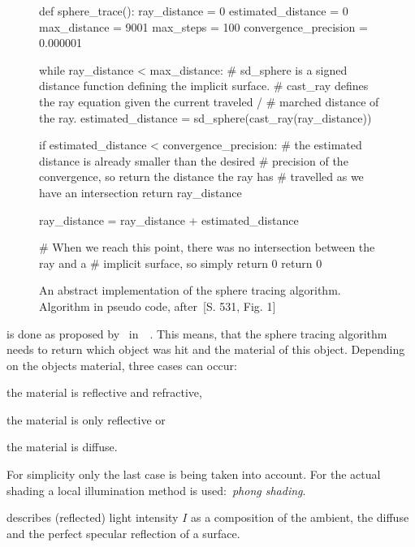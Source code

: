\documentclass[%
    a4paper,    %
    justified,  %
    nobib,      %
    openany     %
]{tufte-book}
\begin{document}
 \begin{figure}
   \label{alg:sphere-tracing}
   \caption{%
     An abstract implementation of the sphere tracing algorithm. Algorithm in
     pseudo code, after~\cite{hart_sphere_1994}[S. 531, Fig. 1]
   }
   \begin{pythoncode}
def sphere_trace():
    ray_distance          = 0
    estimated_distance    = 0
    max_distance          = 9001
    max_steps             = 100
    convergence_precision = 0.000001

    while ray_distance < max_distance:
        # sd_sphere is a signed distance function defining the implicit surface.
        # cast_ray defines the ray equation given the current traveled /
        # marched distance of the ray.
        estimated_distance = sd_sphere(cast_ray(ray_distance))

        if estimated_distance < convergence_precision:
            # the estimated distance is already smaller than the desired
            # precision of the convergence, so return the distance the ray has
            # travelled as we have an intersection
            return ray_distance

        ray_distance = ray_distance + estimated_distance

    # When we reach this point, there was no intersection between the ray and a
    # implicit surface, so simply return 0
    return 0
   \end{pythoncode}
\end{figure}

 is done as proposed by~\citeauthor{whitted_improved_1980}
in~~\cite{whitted_improved_1980}. This means,
that the sphere tracing algorithm needs to return which object was hit and the
material of this object. Depending on the objects material, three cases can
occur:
\begin{enumerate*}
  \item the material is reflective and refractive,
  \item the material is only reflective or
  \item the material is diffuse.
\end{enumerate*}
For simplicity only the last case is being taken into account. For the actual
shading a local illumination method is used:~\textit{phong shading}.

 describes (reflected) light intensity
$I$ as a composition of the ambient, the diffuse and the perfect specular
reflection of a surface.
\end{document}
